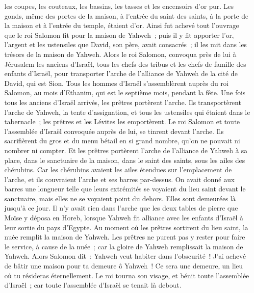 \begin{multicols}{2}
les coupes, les couteaux, les bassins, les tasses et les encensoirs d'or pur. Les gonds, même des portes de la maison, à l'entrée du saint des saints, à la porte de la maison et à l'entrée du temple, étaient d'or.
Ainsi fut achevé tout l'ouvrage que le roi Salomon fit pour la maison de Yahweh~; puis il y fit apporter l'or, l'argent et les ustensiles que David, son père, avait consacrés~; il les mit dans les trésors de la maison de Yahweh.
\VerseOne{}Alors le roi Salomon, convoqua près de lui à Jérusalem les anciens d'Israël, tous les chefs des tribus et les chefs de famille des enfants d'Israël, pour transporter l'arche de l'alliance de Yahweh de la cité de David, qui est Sion.
Tous les hommes d'Israël s'assemblèrent auprès du roi Salomon, au mois d'Ethanim, qui est le septième mois, pendant la fête.
Une fois tous les anciens d'Israël arrivés, les prêtres portèrent l'arche.
Ils transportèrent l'arche de Yahweh, la tente d'assignation, et tous les ustensiles qui étaient dans le tabernacle~; les prêtres et les Lévites les emportèrent.
Le roi Salomon et toute l'assemblée d'Israël convoquée auprès de lui, se tinrent devant l'arche. Ils sacrifièrent du gros et du menu bétail en si grand nombre, qu'on ne pouvait ni nombrer ni compter.
Et les prêtres portèrent l'arche de l'alliance de Yahweh à sa place, dans le sanctuaire de la maison, dans le saint des saints, sous les ailes des chérubins.
Car les chérubins avaient les ailes étendues sur l'emplacement de l'arche, et ils couvraient l'arche et ses barres par-dessus.
On avait donné aux barres une longueur telle que leurs extrémités se voyaient du lieu saint devant le sanctuaire, mais elles ne se voyaient point du dehors. Elles sont demeurées là jusqu'à ce jour.
Il n'y avait rien dans l'arche que les deux tables de pierre que Moïse y déposa en Horeb, lorsque Yahweh fit alliance avec les enfants d'Israël à leur sortie du pays d'Egypte.
Au moment où les prêtres sortirent du lieu saint, la nuée remplit la maison de Yahweh.
Les prêtres ne purent pas y rester pour faire le service, à cause de la nuée~; car la gloire de Yahweh remplissait la maison de Yahweh.
Alors Salomon dit~: Yahweh veut habiter dans l'obscurité~!
J'ai achevé de bâtir une maison pour ta demeure ô Yahweh~! Ce sera une demeure, un lieu où tu résideras éternellement.
Le roi tourna son visage, et bénit toute l'assemblée d'Israël~; car toute l'assemblée d'Israël se tenait là debout.

\end{multicols}
